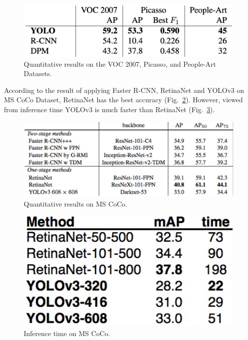 \documentclass[letterpaper]{article} %
\begin{document}
\begin{figure}[ht]
\hspace{-10mm}
\centering
\includegraphics[scale = 0.4]{Figure/Results_1.png}
\caption{\footnotesize{Quantitative results on the VOC 2007, Picasso, and People-Art Datasets.\footnotemark}}
\label{fig:R_1}
\vspace{0mm}
\end{figure}
\noindent According to the result of applying Faster R-CNN, RetinaNet and YOLOv3 on MS CoCo Dataset, RetinaNet has the best accuracy (Fig.~\ref{fig:R_2}). However, viewed from inference time YOLOv3 is much faster than RetinaNet (Fig.~\ref{fig:R_3}).
\begin{figure}[ht]
\hspace{-10mm}
\centering
\includegraphics[scale = 0.2]{Figure/Result_2.jpg}
\caption{\footnotesize{Quantitative results on MS CoCo.}}
\label{fig:R_2}
\vspace{0mm}
\end{figure}
\begin{figure}[ht]
\hspace{-10mm}
\centering
\includegraphics[scale = 0.5]{Figure/Result_3.jpg}
\caption{\footnotesize{Inference time on MS CoCo.}}
\label{fig:R_3}
\vspace{0mm}
\end{figure}
\end{document}
